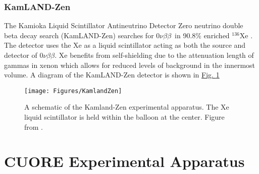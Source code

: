 \documentclass[12pt,a4paper]{article}
\newcommand{\zeronubb}{$0\nu \beta \beta$}
\begin{document}
\subsubsection*{KamLAND-Zen}
The Kamioka Liquid Scintillator Antineutrino Detector Zero neutrino double beta decay search (KamLAND-Zen) searches for \zeronubb~in 90.8\% enriched $^{136}$Xe \cite{KamLAND-Zen:2016pfg}. The detector uses the Xe as a liquid scintillator acting as both the source and detector of \zeronubb. Xe benefits from self-shielding due to the attenuation length of gammas in xenon which allows for reduced levels of background in the innermost volume. A diagram of the KamLAND-Zen detector is shown in \hyperref[fig:kamlandzen]{Fig. \ref*{fig:kamlandzen}}

\begin{figure}[tbph]
\centering
\texttt{[image: Figures/KamlandZen]}
\caption{A schematic of the Kamland-Zen experimental apparatus. The Xe liquid scintillator is held within the balloon at the center. Figure from \cite{::2015uaa}.}
\label{fig:kamlandzen}
\end{figure}

\begin{comment}
\begin{table}[htbp]
\centering
\begin{tabular}{|c|c|c|c|}
\hline 
Experiment & Isotope & \zeronubb~Half-Life (yr) & Q-Value (keV) \\ 
\hline 
Gerda & $^{76}$Ge & $>5.2 \times 10^{25}$ & 2039 \\ 
\hline 
EXO-200 & $^{136}$Xe & $>1.1 \times 10^{25}$ & 2458 \\ 
\hline 
NEMO &  &  \\ 
\hline 
Majorana &  &  \\ 
\hline 
Heidelburg-Moscow &  &  \\ 
\hline 
Kamland-Zen &  &  \\ 
\hline 
CUORE &  & 2528 \\ 
\hline 
\end{tabular} 
\end{table}
\end{comment}

\section{CUORE Experimental Apparatus}
\end{document}
